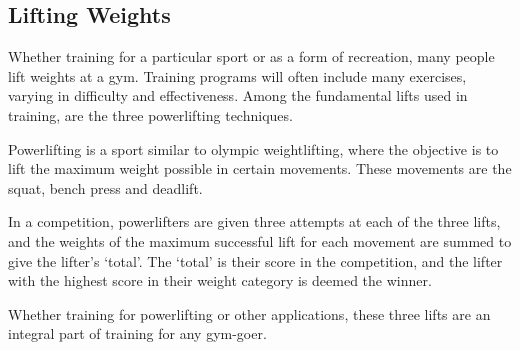 \subsection{Lifting Weights}

Whether training for a particular sport or as a form of recreation, many people lift weights at a gym. Training programs will often include many exercises, varying in difficulty and effectiveness. Among the fundamental lifts used in training, are the three powerlifting techniques.

Powerlifting is a sport similar to olympic weightlifting, where the objective is to lift the maximum weight possible in certain movements. These movements are the squat, bench press and deadlift.





In a competition, powerlifters are given three attempts at each of the three lifts, and the weights of the maximum successful lift for each movement are summed to give the lifter’s ‘total’. The ‘total’ is their score in the competition, and the lifter with the highest score in their weight category is deemed the winner.

Whether training for powerlifting or other applications, these three lifts are an integral part of training for any gym-goer.